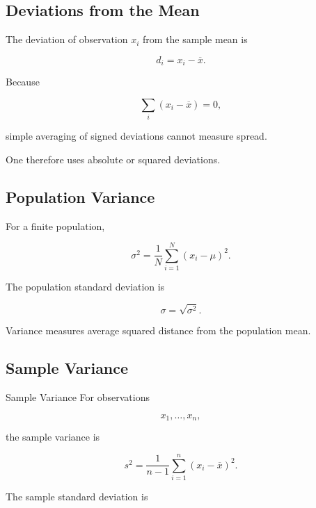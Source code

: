\subsection{Deviations from the Mean}
\label{subsec:deviations-from-mean}

The deviation of observation \(x_i\) from the sample mean is

\[
\boxed{
d_i
=
x_i-\overline{x}.
}
\]

Because

\[
\sum_i
(x_i-\overline{x})
=
0,
\]

simple averaging of signed deviations cannot measure spread.

One therefore uses absolute or squared deviations.

\subsection{Population Variance}
\label{subsec:population-variance-statistics}

For a finite population,

\[
\boxed{
\sigma^2
=
\frac1N
\sum_{i=1}^{N}
(x_i-\mu)^2.
}
\]

The population standard deviation is

\[
\boxed{
\sigma
=
\sqrt{\sigma^2}.
}
\]

Variance measures average squared distance from the population mean.

\subsection{Sample Variance}
\label{subsec:sample-variance}

\begin{definitionbox}{Sample Variance}
For observations

\[
x_1,\ldots,x_n,
\]

the sample variance is

\[
\boxed{
s^2
=
\frac1{n-1}
\sum_{i=1}^{n}
(x_i-\overline{x})^2.
}
\]
\end{definitionbox}

The sample standard deviation is

